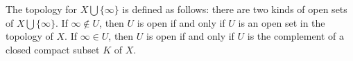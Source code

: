 \documentclass[12pt]{article}
\begin{document}
The topology for $X\bigcup \{\infty\}$ is defined as follows: there are two kinds of open sets of $X\bigcup \{\infty\}$. If $\infty \notin U$, then $U$ is open if and only if $U$ is an open set in the topology of $X$. If $\infty \in U$, then $U$ is open if and only if $U$ is the complement of a closed compact subset $K$ of $X$.
\end{document}
